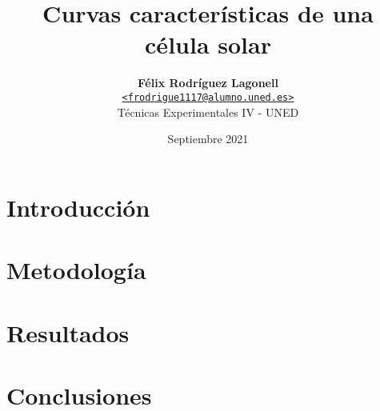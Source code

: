 \documentclass[a4paper, twocolumn]{article}
\title{\vspace{-1.5em}\textbf{Curvas características de una célula solar}}
\author{{\textbf{Félix Rodríguez Lagonell}} \\
        {\href{mailto:frodrigue1117@alumno.uned.es}
        {\texttt{<frodrigue1117@alumno.uned.es>}}} \\
        {Técnicas Experimentales IV - UNED}}
\date{Septiembre 2021}
\begin{document}
    \maketitle

    \begin{abstract}  \end{abstract} %
    \section{Introducción} \label{sec:introduction} 
    \section{Metodología} \label{sec:related_work} 
    \section{Resultados} \label{sec:results} 
    \section{Conclusiones} \label{sec:conclusions} 

    \nocite{*} %
    
    
    \appendix

    
\end{document}
